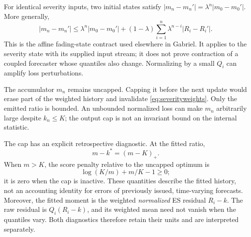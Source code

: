 \documentclass[11pt,a4paper]{article}
\theoremstyle{definition}\newtheorem{definition}[theorem]{Definition}
\begin{document}
For identical severity inputs, two initial states satisfy $|m_n-m_n'|=\lambda^n|m_0-m_0'|$. More generally,
\begin{equation}
 |m_n-m_n'|\le\lambda^n|m_0-m_0'|
 +(1-\lambda)\sum_{i=1}^n\lambda^{n-i}|R_i-R_i'|.
 \label{eq:severityfading}
\end{equation}
This is the affine fading-state contract used elsewhere in Gabriel. It applies to the severity state with its supplied input stream; it does not prove contraction of a coupled forecaster whose quantiles also change. Normalizing by a small $Q_i$ can amplify loss perturbations.

The accumulator $m_n$ remains uncapped. Capping it before the next update would erase part of the weighted history and invalidate \eqref{eq:severityweights}. Only the emitted ratio is bounded. An unbounded normalized loss can make $m_n$ arbitrarily large despite $k_n\le K$; the output cap is not an invariant bound on the internal statistic.

The cap has an explicit retrospective diagnostic. At the fitted ratio,
\begin{equation}
 m-k^*=(m-K)_+.
 \label{eq:severitycapresidual}
\end{equation}
When $m>K$, the score penalty relative to the uncapped optimum is
\begin{equation}
 \log(K/m)+m/K-1\ge0;
 \label{eq:severitycappenalty}
\end{equation}
it is zero when the cap is inactive. These quantities describe the fitted history, not an accounting identity for errors of previously issued, time-varying forecasts. Moreover, the fitted moment is the weighted \emph{normalized} ES residual $R_i-k$. The raw residual is $Q_i(R_i-k)$, and its weighted mean need not vanish when the quantiles vary. Both diagnostics therefore retain their units and are interpreted separately.
\end{document}
